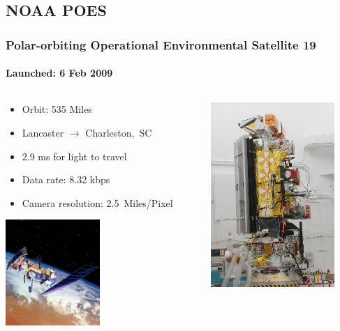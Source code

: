 \documentclass[]{beamer}
\begin{document}
\subsection{NOAA POES}
\begin{frame}
    \frametitle{Polar-orbiting Operational Environmental Satellite 19}
    \framesubtitle{Launched: 6 Feb 2009}
    \begin{columns}[T]
        \begin{column}[T]{5.5cm}
            \begin{itemize}
                \item Orbit: 535 Miles
                \item Lancaster $\to$ Charleston,~SC
                \item 2.9 ms for light to travel
                \item Data rate: 8.32 kbps
                \item Camera resolution: 2.5~Miles/Pixel
            \end{itemize}
            \includegraphics[height=4cm,keepaspectratio]{images/noaa-19-sat-illus.png}
        \end{column}
        \begin{column}[T]{5cm}
            \includegraphics[height=7cm]{images/noaa19-sat.jpg}
        \end{column}
    \end{columns}
\end{frame}
\end{document}
